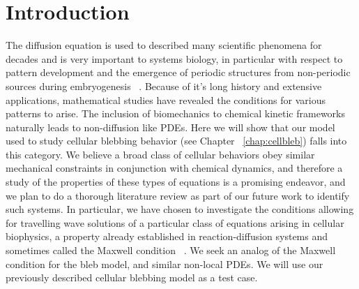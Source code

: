 \section{Introduction}

The diffusion equation is used to described many scientific phenomena for decades and is very important to systems biology, in particular with respect to pattern development and the emergence of periodic structures from non-periodic sources during embryogenesis ~\cite{Kondo2010}. Because of it's long history and extensive applications, mathematical studies have revealed the conditions for various patterns to arise. The inclusion of biomechanics to chemical kinetic frameworks naturally leads to non-diffusion like PDEs. Here we will show that our model used to study cellular blebbing behavior (see Chapter ~\ref{chap:cellbleb}) falls into this category. We believe a broad class of cellular behaviors obey similar mechanical constraints in conjunction with chemical dynamics, and therefore a study of the properties of these types of equations is a promising endeavor, and we plan to do a thorough literature review as part of our future work to identify such systems. In particular, we have chosen to investigate the conditions allowing for travelling wave solutions of a particular class of equations arising in cellular biophysics, a property already established in reaction-diffusion systems and sometimes called the Maxwell condition ~\cite{Anonymous:OS1MPwCl,Mori:2008hj}. We seek an analog of the Maxwell condition for the bleb model, and similar non-local PDEs. We will use our previously described cellular blebbing model as a test case.\\







